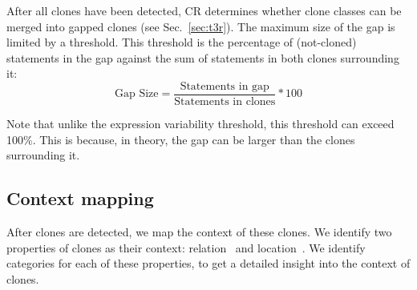 \documentclass[sigconf,review,anonymous]{acmart}
\begin{document}
After all clones have been detected, CR determines whether clone classes can be merged into gapped clones (see Sec.~\ref{sec:t3r}). The maximum size of the gap is limited by a threshold. This threshold is the percentage of (not-cloned) statements in the gap against the sum of statements in both clones surrounding it:
\begin{equation}\label{eq:type3r}
\text{Gap Size}=\frac{\text{Statements in gap}}{\text{Statements in clones}}*100
\end{equation}

Note that unlike the expression variability threshold, this threshold can exceed 100\%. This is because, in theory, the gap can be larger than the clones surrounding it.

\subsection{Context mapping} \label{sec:context}
After clones are detected, we map the context of these clones. We identify two properties of clones as their context: relation~\cite{fontana2012duplicated} and location~\cite{tairas2011representing}. We identify categories for each of these properties, to get a detailed insight into the context of clones.
\end{document}
